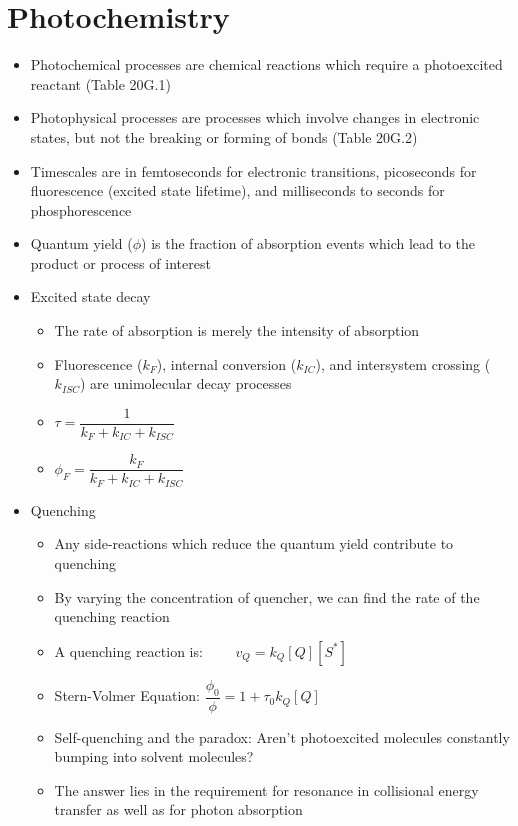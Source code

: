 \documentclass[12pt, openany, letterpaper]{memoir}
\begin{document}
\section{Photochemistry}
\begin{itemize}
	\item Photochemical processes are chemical reactions which require a photoexcited reactant (Table 20G.1)
	\item Photophysical processes are processes which involve changes in electronic states, but not the breaking or forming of bonds (Table 20G.2)
	\item Timescales are in femtoseconds for electronic transitions, picoseconds for fluorescence (excited state lifetime), and milliseconds to seconds for phosphorescence
	\item Quantum yield ($\phi$) is the fraction of absorption events which lead to the product or process of interest
	\item Excited state decay
	      \begin{itemize}
		      \item The rate of absorption is merely the intensity of absorption
		      \item Fluorescence ($k_F$), internal conversion ($k_{IC}$), and intersystem crossing ($k_{ISC}$) are unimolecular decay processes
		      \item $\tau=\dfrac{1}{k_F+k_{IC}+k_{ISC}}$
		      \item $\phi_F=\dfrac{k_F}{k_F+k_{IC}+k_{ISC}}$
	      \end{itemize}
	\item Quenching
	      \begin{itemize}
		      \item Any side-reactions which reduce the quantum yield contribute to quenching
		      \item By varying the concentration of quencher, we can find the rate of the quenching reaction
		      \item A quenching reaction is:  $\hspace{2em} v_Q=k_Q[Q][S^*]$
		      \item Stern-Volmer Equation: $\dfrac{\phi_{0}}{\phi} = 1 + \tau_0k_Q[Q]$
		      \item Self-quenching and the paradox: Aren't photoexcited molecules constantly bumping into solvent molecules?
		      \item The answer lies in the requirement for resonance in collisional energy transfer as well as for photon absorption

\end{itemize}
\end{itemize}
\end{document}

